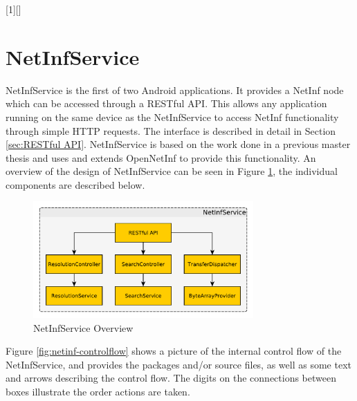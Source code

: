 
[1][]%
	{\minipage{\linewidth} 
		}
	{\endminipage}

\section{NetInfService}
\label{sec:NetInfService}

NetInfService is the first of two Android applications. It provides a NetInf node which can be accessed through a RESTful API. This allows any application running on the same device as the NetInfService to access NetInf functionality through simple HTTP requests. The interface is described in detail in Section \ref{sec:RESTful API}. NetInfService is based on the work done in a previous master thesis \cite{hugomiguel} and uses and extends OpenNetInf to provide this functionality. An overview of the design of NetInfService can be seen in Figure \ref{fig:netinfserviceoverview}, the individual components are described below. 

\begin{figure}
	\centering
		\includegraphics[width=0.75\textwidth]{./img/netinfservice}
    	\caption{NetInfService Overview}
	\label{fig:netinfserviceoverview}
\end{figure}

Figure \ref{fig:netinf-controlflow} shows a picture of the internal control flow of the NetInfService,
and provides the packages and/or source files, as well as some text and arrows describing the control flow.
The digits on the connections between boxes illustrate the order actions are taken.


